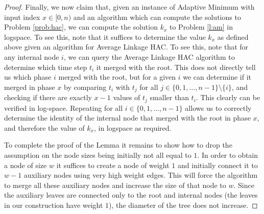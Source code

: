 \documentclass[11pt]{article}
\newcommand{\am}{\textsf{Adaptive Minimum}\xspace}
\newcommand{\hac}{\textsf{Average Linkage HAC}\xspace}
\begin{document}
\begin{proof}
Finally, we now claim that, given an instance of \am with input index $x \in [0,n)$ and  an algorithm which can compute the solutions to Problem \ref{prob:hac}, we can compute the solution $k_x$ to Problem \ref{l:am} in logspace. To see this, note that it suffices to determine the value $k_x$ as defined above given an algorithm for \hac. To see this, note that for any internal node $i$, we can query the \hac algorithm to determine which time step $t_i$ it merged with the root. 
This does not directly tell us which phase $i$ merged with the root, but for a given $i$ we can determine if it merged in phase $x$ 
by comparing $t_i$ with $t_j$ for all $j \in \{0,1,\dots,n-1\} \setminus \{i\}$, and checking if there are exactly $x-1$ values of $t_j$ smaller than $t_i$. This clearly can be verified in log-space. 
Repeating for all $i \in  \{0,1,\dots,n-1\}$ allows us to correctly determine the identity of the internal node that merged with the root in phase $x$, and therefore the value of $k_x$, in logspace as required.

To complete the proof of the Lemma it remains to show how to drop the assumption on the node sizes being initially not all equal to $1$.
In order to obtain a node of size $w$ it suffices to create a node of weight $1$ and initially connect it to $w-1$ auxiliary nodes using very high weight edges.
This will force the algorithm to merge all these auxiliary nodes and increase the size of that node to $w$.
Since the auxiliary leaves are connected only to the root and internal nodes (the leaves in our construction have weight $1$), the diameter of the tree does not increase.
\end{proof}







\newpage



%
%
\end{document}
